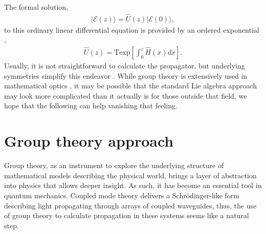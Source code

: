 \documentclass[9pt,twocolumn,twoside]{osajnl}
\begin{document}
The formal solution,
\begin{eqnarray}
\vert \mathcal{E}(z) \rangle = \hat{U}(z) \vert \mathcal{E}(0) \rangle,
\end{eqnarray}
to this ordinary linear differential equation is provided by an ordered exponential \cite{Magnus1954p649,Blanes2009p151}, 
\begin{eqnarray} 
\hat{U}(z) = \mathrm{Texp} \left[ \int_{0}^{z} \hat{H}(x) dx \right].
\end{eqnarray}
Usually, it is not straightforward to calculate the propagator,
but underlying symmetries simplify this endeavor \cite{Lie1880p441,Neumaier2008}.
While group theory is extensively used in mathematical optics \cite{Wolf2004,Lakshminarayanan2012}, it may be possible that the standard Lie algebra approach may look more complicated than it actually is for those outside that field, we hope that the following can help vanishing that feeling.


\section{Group theory approach}

Group theory, as an instrument to explore the underlying structure of mathematical models describing the physical world, brings a layer of abstraction into physics that allows deeper insight.
As such, it has become an essential tool in quantum mechanics.
Coupled mode theory delivers a Schr\"odinger-like form describing light propagating through arrays of coupled waveguides, thus, the use of group theory to calculate propagation in these systems seems like a natural step.
\end{document}
